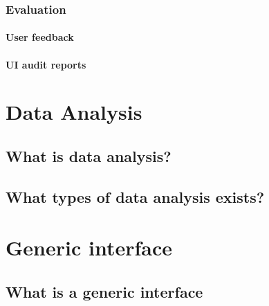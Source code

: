     \subsubsection{Evaluation}
    \paragraph{User feedback}
    \paragraph{UI audit reports}
    
\section{Data Analysis}
    \subsection{What is data analysis?}
    \subsection{What types of data analysis exists?}

\section{Generic interface}
    \subsection{What is a generic interface}